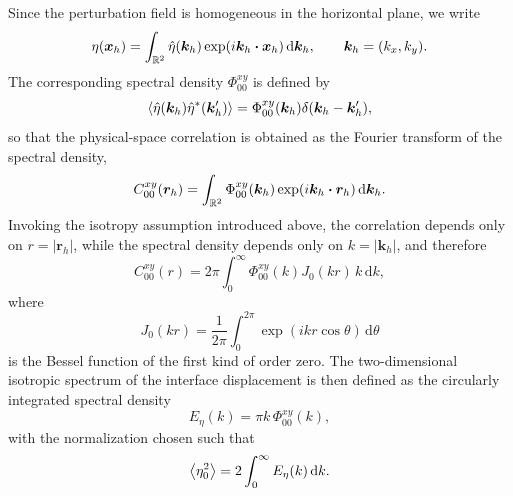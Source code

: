 Since the perturbation field is homogeneous in the horizontal plane, we write
\begin{equation}
    \eta(\boldsymbol{x}_h)
    =
    \int_{\mathbb{R}^2}
        \hat{\eta}(\boldsymbol{k}_h)
        \exp(i\boldsymbol{k}_h\boldsymbol{\cdot}\boldsymbol{x}_h)
    \,\mathrm{d}\boldsymbol{k}_h,
    \qquad
    \boldsymbol{k}_h=(k_x,k_y).
    \label{eq:eta_fourier_transform}
\end{equation}
The corresponding spectral density \(\Phi_{00}^{xy}\) is defined by
\begin{equation}
    \left\langle 
        \hat{\eta}(\boldsymbol{k}_h)
        \hat{\eta}^{\ast}(\boldsymbol{k}'_h)
     \right\rangle
    =
    \Phi_{00}^{xy}(\boldsymbol{k}_h)
    \delta(\boldsymbol{k}_h-\boldsymbol{k}'_h),
    \label{eq:eta_spectral_density_definition}
\end{equation}
so that the physical-space correlation is obtained as the Fourier transform of the spectral density,
\begin{equation}
    C_{00}^{xy}(\boldsymbol{r}_h)
    =
    \int_{\mathbb{R}^2}
        \Phi_{00}^{xy}(\boldsymbol{k}_h)
        \exp(i\boldsymbol{k}_h\boldsymbol{\cdot}\boldsymbol{r}_h)
    \,\mathrm{d}\boldsymbol{k}_h.
    \label{eq:eta_correlation_spectral_density}
\end{equation}
Invoking the isotropy assumption introduced above, the correlation depends only on \(r=\lvert\boldsymbol{r}_h\rvert\), while the spectral density depends only on \(k=\lvert\boldsymbol{k}_h\rvert\), and therefore
\begin{equation}
    C_{00}^{xy}(r)
    =
    2\pi
    \int_0^\infty
        \Phi_{00}^{xy}(k)
        J_0(kr)\,
        k
    \,\mathrm{d}k,
    \label{eq:eta_correlation_hankel_phi}
\end{equation}
where
\begin{equation}
    J_0(kr)
    =
    \frac{1}{2\pi}
    \int_0^{2\pi}
        \exp(i k r\cos\theta)
    \,\mathrm{d}\theta
    \label{eq:bessel_j0}
\end{equation}
is the Bessel function of the first kind of order zero. The two-dimensional isotropic spectrum of the interface displacement is then defined as the circularly integrated spectral density
\begin{equation}
    E_{\eta}(k)
    =
    \pi k\,\Phi_{00}^{xy}(k),
    \label{eq:eta_2d_spectrum_definition}
\end{equation}
with the normalization chosen such that
\begin{equation}
    \left\langle \eta_0^2 \right\rangle
    =
    2
    \int_0^\infty
        E_{\eta}(k)
    \,\mathrm{d}k.
    \label{eq:eta_variance_spectrum}
\end{equation}
